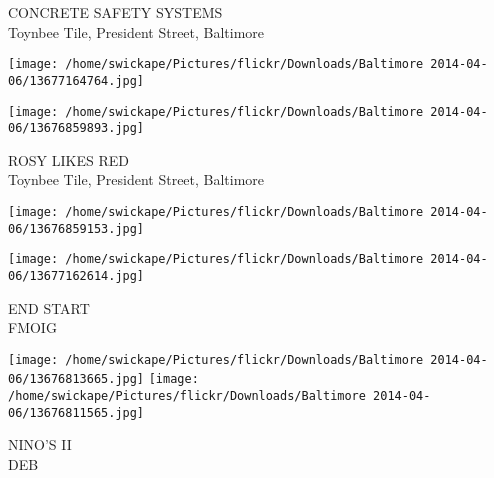 \documentclass[10pt,letterpaper]{article}
\begin{document}
CONCRETE SAFETY SYSTEMS\\
Toynbee Tile, President Street, Baltimore\\
\pagebreak

\texttt{[image: /home/swickape/Pictures/flickr/Downloads/Baltimore 2014-04-06/13677164764.jpg]}

\vspace{0.25in}
\texttt{[image: /home/swickape/Pictures/flickr/Downloads/Baltimore 2014-04-06/13676859893.jpg]}

ROSY LIKES RED\\
Toynbee Tile, President Street, Baltimore\\
\pagebreak

\texttt{[image: /home/swickape/Pictures/flickr/Downloads/Baltimore 2014-04-06/13676859153.jpg]}

\vspace{0.25in}
\texttt{[image: /home/swickape/Pictures/flickr/Downloads/Baltimore 2014-04-06/13677162614.jpg]}

END START\\
FMOIG\\
\pagebreak

\texttt{[image: /home/swickape/Pictures/flickr/Downloads/Baltimore 2014-04-06/13676813665.jpg]}
\texttt{[image: /home/swickape/Pictures/flickr/Downloads/Baltimore 2014-04-06/13676811565.jpg]}

NINO'S II\\
DEB\\
\pagebreak
\end{document}

